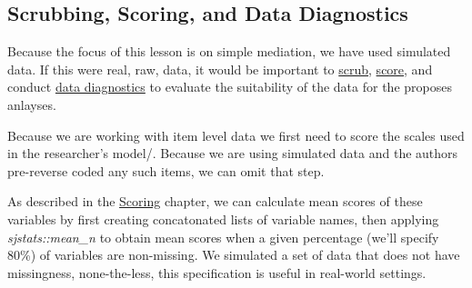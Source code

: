 \documentclass[
  11pt,
]{book}
\newenvironment{Shaded}{\begin{snugshade}}{\end{snugshade}}
\newcommand{\CommentTok}[1]{\textcolor[rgb]{0.37,0.37,0.37}{\textit{#1}}}
\newcommand{\DecValTok}[1]{\textcolor[rgb]{0.06,0.06,0.06}{#1}}
\newcommand{\FunctionTok}[1]{\textcolor[rgb]{0.27,0.27,0.27}{\textbf{#1}}}
\newcommand{\NormalTok}[1]{#1}
\newcommand{\OtherTok}[1]{\textcolor[rgb]{0.37,0.37,0.37}{#1}}
\newcommand{\SpecialCharTok}[1]{\textcolor[rgb]{0.43,0.43,0.43}{\textbf{#1}}}
\begin{document}
\begin{Shaded}
\end{Shaded}

\hypertarget{scrubbing-scoring-and-data-diagnostics}{%
\subsection{Scrubbing, Scoring, and Data Diagnostics}\label{scrubbing-scoring-and-data-diagnostics}}

Because the focus of this lesson is on simple mediation, we have used simulated data. If this were real, raw, data, it would be important to \href{https://lhbikos.github.io/ReC_MultivModel/scrub.html}{scrub}, \href{https://lhbikos.github.io/ReC_MultivModel/score.html}{score}, and conduct \href{https://lhbikos.github.io/ReC_MultivModel/DataDx.html}{data diagnostics} to evaluate the suitability of the data for the proposes anlayses.

Because we are working with item level data we first need to score the scales used in the researcher's model/. Because we are using simulated data and the authors pre-reverse coded any such items, we can omit that step.

As described in the \href{https://lhbikos.github.io/ReC_MultivModel/score.html}{Scoring} chapter, we can calculate mean scores of these variables by first creating concatonated lists of variable names, then applying \emph{sjstats::mean\_n} to obtain mean scores when a given percentage (we'll specify 80\%) of variables are non-missing. We simulated a set of data that does not have missingness, none-the-less, this specification is useful in real-world settings.
\end{document}
